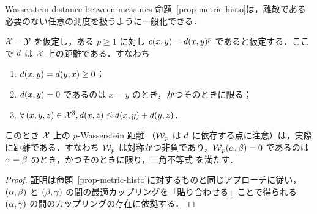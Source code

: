 \begin{rem1}{Wasserstein distance between measures}
命題~\ref{prop-metric-histo}は，離散である必要のない任意の測度を扱うように一般化できる．

\begin{prop}\label{prop-metric-measure}
$\mathcal{X}=\mathcal{Y}$ を仮定し，ある $p \geq 1$ に対し $c(x,y)=d(x,y)^p$ であると仮定する．ここで $d$ は $\mathcal{X}$ 上の距離である．すなわち
\begin{enumerate}[label=(\roman*)]
	\item  $d(x,y) = d(y,x) \geq 0$；
	\item  $d(x,y)=0$ であるのは $x=y$ のとき，かつそのときに限る；
	\item  $\forall \, (x,y,z) \in \mathcal{X}^3, d(x,z) \leq d(x,y)+d(y,z)$．
\end{enumerate}
このとき $\mathcal{X}$ 上の $p$-Wasserstein 距離
（$\operatorname{\mathcal{W}}_p$ は $d$ に依存する点に注意）は，実際に距離である．すなわち $\operatorname{\mathcal{W}}_p$ は対称かつ非負であり，$\operatorname{\mathcal{W}}_p(\alpha,\beta)=0$ であるのは $\alpha = \beta$ のとき，かつそのときに限り，三角不等式
を満たす．
\end{prop}
\begin{proof}
証明は命題~\ref{prop-metric-histo}に対するものと同じアプローチに従い，$(\alpha,\beta)$ と $(\beta,\gamma)$ の間の最適カップリングを「貼り合わせる」ことで得られる $(\alpha,\gamma)$ の間のカップリングの存在に依拠する．
\end{proof}
\end{rem1}


